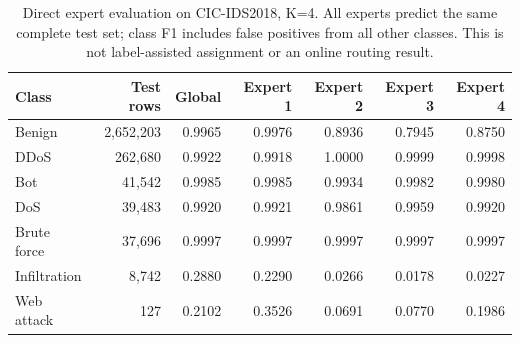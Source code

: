 \begin{table}[H]
\centering
\small
\caption{Direct expert evaluation on CIC-IDS2018, K=4. All experts predict the same complete test set; class F1 includes false positives from all other classes. This is not label-assisted assignment or an online routing result.}
\label{tab:experts_cic2018}
\begin{tabular}{lrrrrrr}
\toprule
Class & Test rows & Global & Expert 1 & Expert 2 & Expert 3 & Expert 4 \\
\midrule
Benign & 2,652,203 & 0.9965 & 0.9976 & 0.8936 & 0.7945 & 0.8750 \\
DDoS & 262,680 & 0.9922 & 0.9918 & 1.0000 & 0.9999 & 0.9998 \\
Bot & 41,542 & 0.9985 & 0.9985 & 0.9934 & 0.9982 & 0.9980 \\
DoS & 39,483 & 0.9920 & 0.9921 & 0.9861 & 0.9959 & 0.9920 \\
Brute force & 37,696 & 0.9997 & 0.9997 & 0.9997 & 0.9997 & 0.9997 \\
Infiltration & 8,742 & 0.2880 & 0.2290 & 0.0266 & 0.0178 & 0.0227 \\
Web attack & 127 & 0.2102 & 0.3526 & 0.0691 & 0.0770 & 0.1986 \\
\bottomrule
\end{tabular}
\end{table}

